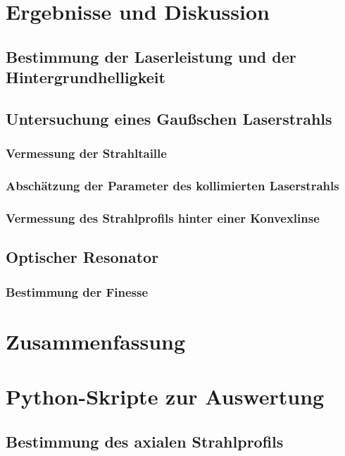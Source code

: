 \documentclass[11pt,a4paper,oneside]{scrartcl}
\begin{document}
\section{Ergebnisse und Diskussion}
\subsection{Bestimmung der Laserleistung und der Hintergrundhelligkeit}
\subsection{Untersuchung eines Gaußschen Laserstrahls}
\subsubsection{Vermessung der Strahltaille}
\subsubsection{Abschätzung der Parameter des kollimierten Laserstrahls}
\subsubsection{Vermessung des Strahlprofils hinter einer Konvexlinse}
\subsection{Optischer Resonator}
\subsubsection{Bestimmung der Finesse}
\section{Zusammenfassung}
\newpage

 

\appendix

\section{Python-Skripte zur Auswertung}
\subsection{Bestimmung des axialen Strahlprofils}

\end{document}
